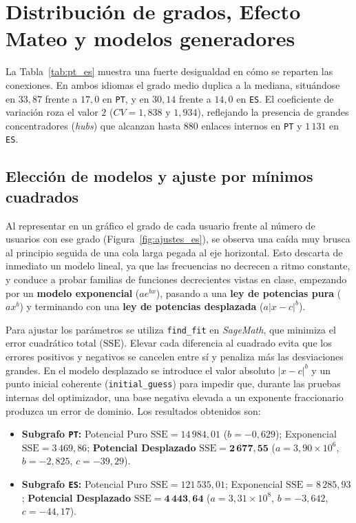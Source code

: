 \documentclass[11pt,a4paper]{article}
\begin{document}
\section{Distribución de grados, Efecto Mateo y modelos generadores}

La Tabla~\ref{tab:pt_es} muestra una fuerte desigualdad en cómo se reparten las conexiones. En ambos idiomas el grado medio duplica a la mediana, situándose en $33,87$ frente a $17,0$ en \texttt{PT}, y en $30,14$ frente a $14,0$ en \texttt{ES}. El coeficiente de variación roza el valor $2$ ($CV = 1,838$ y $1,934$), reflejando la presencia de grandes concentradores (\textit{hubs}) que alcanzan hasta $880$ enlaces internos en \texttt{PT} y $1\,131$ en \texttt{ES}.

\subsection{Elección de modelos y ajuste por mínimos cuadrados}
Al representar en un gráfico el grado de cada usuario frente al número de usuarios con ese grado (Figura~\ref{fig:ajustes_es}), se observa una caída muy brusca al principio seguida de una cola larga pegada al eje horizontal. Esto descarta de inmediato un modelo lineal, ya que las frecuencias no decrecen a ritmo constante, y conduce a probar familias de funciones decrecientes vistas en clase, empezando por un \textbf{modelo exponencial} ($a e^{bx}$), pasando a una \textbf{ley de potencias pura} ($a x^b$) y terminando con una \textbf{ley de potencias desplazada} ($a |x - c|^b$).

Para ajustar los parámetros se utiliza \texttt{find\_fit} en \textit{SageMath}, que minimiza el error cuadrático total ($\text{SSE}$). Elevar cada diferencia al cuadrado evita que los errores positivos y negativos se cancelen entre sí y penaliza más las desviaciones grandes. En el modelo desplazado se introduce el valor absoluto $|x - c|^b$ y un punto inicial coherente (\texttt{initial\_guess}) para impedir que, durante las pruebas internas del optimizador, una base negativa elevada a un exponente fraccionario produzca un error de dominio. Los resultados obtenidos son:
\begin{itemize}[leftmargin=*, itemsep=2pt]
  \item \textbf{Subgrafo \texttt{PT}:} Potencial Puro $\text{SSE} = 14\,984,01$ ($b = -0,629$); Exponencial $\text{SSE} = 3\,469,86$; \textbf{Potencial Desplazado} $\text{SSE} = \mathbf{2\,677,55}$ ($a = 3,90\times 10^6$, $b = -2,825$, $c = -39,29$).
  \item \textbf{Subgrafo \texttt{ES}:} Potencial Puro $\text{SSE} = 121\,535,01$; Exponencial $\text{SSE} = 8\,285,93$; \textbf{Potencial Desplazado} $\text{SSE} = \mathbf{4\,443,64}$ ($a = 3,31\times 10^8$, $b = -3,642$, $c = -44,17$).
\end{itemize}
\end{document}
